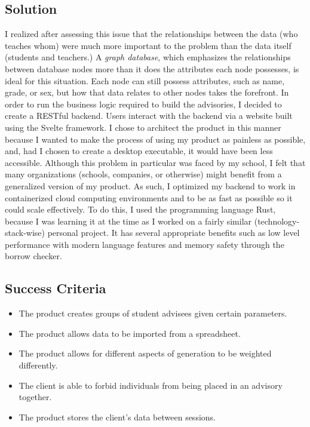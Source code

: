 \documentclass[advisory-ia.tex]{subfiles}
\begin{document}
  \subsection{Solution}
  I realized after assessing this issue that the relationships between the data (who teaches whom) were much more important to the problem than the data itself (students and teachers.)
  A \textit{graph database}, which emphasizes the relationships between database nodes more than it does the attributes each node possesses, is ideal for this situation.
  Each node can still possess attributes, such as name, grade, or sex, but how that data relates to other nodes takes the forefront.
  In order to run the business logic required to build the advisories, I decided to create a RESTful backend.
  Users interact with the backend via a website built using the Svelte framework.
  I chose to architect the product in this manner because I wanted to make the process of using my product as painless as possible, and, had I chosen to create a desktop executable, it would have been less accessible.
  Although this problem in particular was faced by my school, I felt that many organizations (schools, companies, or otherwise) might benefit from a generalized version of my product.
  As such, I optimized my backend to work in containerized cloud computing environments and to be as fast as possible so it could scale effectively.
  To do this, I used the programming language Rust, because I was learning it at the time as I worked on a fairly similar (technology-stack-wise) personal project.
  It has several appropriate benefits such as low level performance with modern language features and memory safety through the borrow checker.

  \subsection{Success Criteria}
  \begin{itemize}
    \itemsep-4pt
    \item The product creates groups of student advisees given certain parameters.
    \item The product allows data to be imported from a spreadsheet.
    \item The product allows for different aspects of generation to be weighted differently.
    \item The client is able to forbid individuals from being placed in an advisory together.
    \item The product stores the client's data between sessions.
  \end{itemize}
\end{document}
